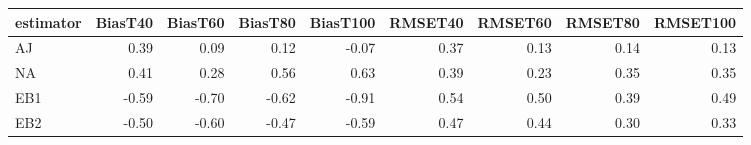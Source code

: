 \begin{table}[ht]
\centering
\begin{tabular}{lrrrrrrrr}
  \toprule
estimator & BiasT40 & BiasT60 & BiasT80 & BiasT100 & RMSET40 & RMSET60 & RMSET80 & RMSET100 \\ 
  \midrule
AJ & 0.39 & 0.09 & 0.12 & -0.07 & 0.37 & 0.13 & 0.14 & 0.13 \\ 
  NA & 0.41 & 0.28 & 0.56 & 0.63 & 0.39 & 0.23 & 0.35 & 0.35 \\ 
  EB1 & -0.59 & -0.70 & -0.62 & -0.91 & 0.54 & 0.50 & 0.39 & 0.49 \\ 
  EB2 & -0.50 & -0.60 & -0.47 & -0.59 & 0.47 & 0.44 & 0.30 & 0.33 \\ 
   \bottomrule
\end{tabular}
\end{table}
